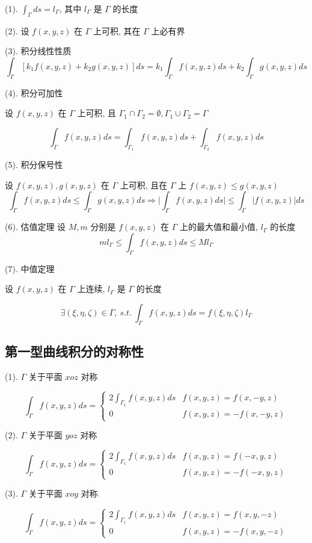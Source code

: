 \begin{corollary}

	(1). $\displaystyle{\int_{\Gamma} ds = l_{\Gamma}}$, 其中 $l_{\Gamma}$ 是 $\Gamma$ 的长度

	(2). 设 $f(x,y,z)$ 在 $\Gamma$ 上可积, 其在 $\Gamma$ 上必有界

	(3). 积分线性性质
	$$\int_{\Gamma}\left[k_{1}f(x,y,z) + k_{2} g(x,y,z)\right]ds = k_{1}\int_{\Gamma}f(x,y,z)ds+k_{2}\int_{\Gamma}g(x,y,z)ds$$

	(4). 积分可加性

	设 $f(x,y,z)$ 在 $\Gamma$ 上可积, 且 $\Gamma_{1}\cap \Gamma_{2}=\emptyset, \Gamma_{1}\cup \Gamma_{2}=\Gamma$

	$$\int_{\Gamma}f(x,y,z)ds = \int_{\Gamma_{1}}f(x,y,z)ds + \int_{\Gamma_{2}}f(x,y,z)ds$$

	(5). 积分保号性

	设 $f(x,y,z), g(x,y,z)$ 在 $\Gamma$ 上可积, 且在 $\Gamma$ 上 $f(x,y,z) \leq g(x,y,z)$
	$$\int_{\Gamma}f(x,y,z)ds \leq \int_{\Gamma}g(x,y,z)ds\Rightarrow \big|\int_{\Gamma}f(x,y,z)ds\big| \leq \int_{\Gamma}\big|f(x,y,z)\big|ds$$

	(6). 估值定理
	设 $M,m$ 分别是 $f(x,y,z)$ 在 $\Gamma$ 上的最大值和最小值, $l_{\Gamma}$ 的长度
	$$ml_{\Gamma} \leq \int_{\Gamma}f(x,y,z)ds \leq Ml_{\Gamma}$$

	(7). 中值定理

	设 $f(x,y,z)$ 在 $\Gamma$ 上连续, $l_{\Gamma}$ 是 $\Gamma$ 的长度

	$$\exists (\xi,\eta,\zeta)\in \Gamma,\ s.t.\ \int_{\Gamma}f(x,y,z) ds = f(\xi,\eta,\zeta)l_{\Gamma}$$
\end{corollary}

\subsection{第一型曲线积分的对称性}

\begin{definition}[普通对称性]
	(1). $\Gamma$ 关于平面 $xoz$ 对称

	$$\int_{\Gamma}f(x,y,z)ds = 
	\begin{cases}
		2\int_{\Gamma_{1}}f(x,y,z)ds & f(x,y,z) = f(x,-y,z)\\
		0                                     & f(x,y,z) = -f(x,-y,z)
	\end{cases}$$

	(2). $\Gamma$ 关于平面 $yoz$ 对称

	$$\int_{\Gamma}f(x,y,z)ds =
	\begin{cases}
		2\int_{\Gamma_{1}}f(x,y,z)ds & f(x,y,z) = f(-x,y,z)\\
		0                                     & f(x,y,z) = -f(-x,y,z)
	\end{cases}$$

	(3). $\Gamma$ 关于平面 $xoy$ 对称

	$$\int_{\Gamma}f(x,y,z)ds =
	\begin{cases}
		2\int_{\Gamma_{1}}f(x,y,z)ds & f(x,y,z) = f(x,y,-z)\\
		0                                     & f(x,y,z) = -f(x,y,-z)
	\end{cases}$$
\end{definition}

